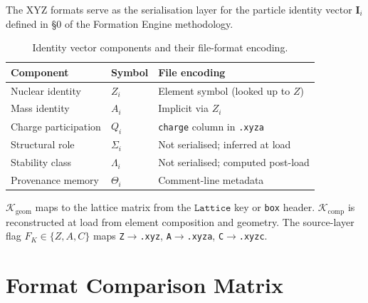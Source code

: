 \documentclass[12pt, a4paper, oneside]{article}
\begin{document}
The XYZ formats serve as the serialisation layer for the particle
identity vector $\mathbf{I}_i$ defined in \S{}0 of the Formation
Engine methodology.

\begin{table}[htbp]
  \centering
  \caption{Identity vector components and their file-format encoding.}
  \label{tab:s0_map}
  \begin{tabular}{llp{6.5cm}}
    \toprule
    Component & Symbol & File encoding \\
    \midrule
    Nuclear identity     & $Z_i$       & Element symbol (looked up to $Z$) \\
    Mass identity        & $A_i$       & Implicit via $Z_i$ \\
    Charge participation & $Q_i$       & \texttt{charge} column in \texttt{.xyza} \\
    Structural role      & $\Sigma_i$  & Not serialised; inferred at load \\
    Stability class      & $\Lambda_i$ & Not serialised; computed post-load \\
    Provenance memory    & $\Theta_i$  & Comment-line metadata \\
    \bottomrule
  \end{tabular}
\end{table}

$\mathcal{K}_{\text{geom}}$ maps to the lattice matrix from the
$\texttt{Lattice}$ key or \texttt{box} header.
$\mathcal{K}_{\text{comp}}$ is reconstructed at load from element
composition and geometry.  The source-layer flag $F_K \in \{Z, A, C\}$
maps \texttt{Z}$\to$\texttt{.xyz}, \texttt{A}$\to$\texttt{.xyza},
\texttt{C}$\to$\texttt{.xyzc}.

\section{Format Comparison Matrix}
\label{sec:matrix}
\end{document}
